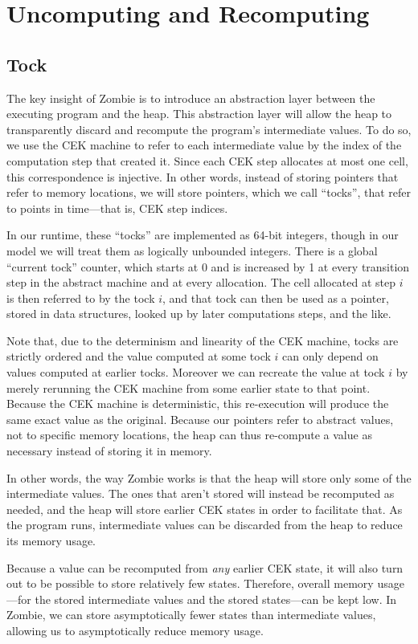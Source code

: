 \section{Uncomputing and Recomputing}
\subsection{Tock}
The key insight of Zombie is to introduce an abstraction layer between the executing program and the heap. This abstraction layer will allow the heap to transparently discard and recompute the program's intermediate values. To do so, we use the CEK machine to refer to each intermediate value by the index of the computation step that created it. Since each CEK step allocates at most one cell, this correspondence is injective. In other words, instead of storing pointers that refer to memory locations, we will store pointers, which we call ``tocks'', that refer to points in time---that is, CEK step indices.

In our runtime, these ``tocks'' are implemented as 64-bit integers, though in our model we will treat them as logically unbounded integers. There is a global ``current tock'' counter, which starts at 0 and is increased by 1 at every transition step in the abstract machine and at every allocation. The cell allocated at step $i$ is then referred to by the tock $i$, and that tock can then be used as a pointer, stored in data structures, looked up by later computations steps, and the like.

Note that, due to the determinism and linearity of the CEK machine, tocks are strictly ordered and the value computed at some tock $i$ can only depend on values computed at earlier tocks. Moreover we can recreate the value at tock $i$ by merely rerunning the CEK machine from some earlier state to that point. Because the CEK machine is deterministic, this re-execution will produce the same exact value as the original. Because our pointers refer to abstract values, not to specific memory locations, the heap can thus re-compute a value as necessary instead of storing it in memory.

In other words, the way Zombie works is that the heap will store only some of the intermediate values. The ones that aren't stored will instead be recomputed as needed, and the heap will store earlier CEK states in order to facilitate that. As the program runs, intermediate values can be discarded from the heap to reduce its memory usage.

Because a value can be recomputed from \emph{any} earlier CEK state, it will also turn out to be possible to store relatively few states. Therefore, overall memory usage---for the stored intermediate values and the stored states---can be kept low. In Zombie, we can store asymptotically fewer states than intermediate values, allowing us to asymptotically reduce memory usage.

